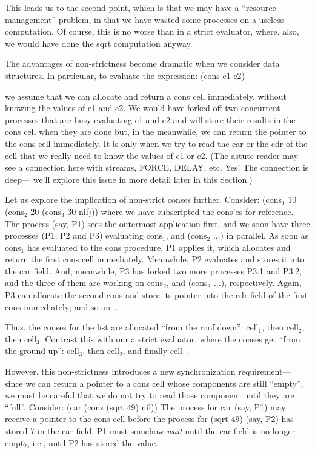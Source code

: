 This leads us to the second point, which is that we may have a
``resource-management'' problem, in that we have wasted some
processes on a useless computation.  Of course, this is no worse
than in a strict evaluator, where, also, we would have done the {\cf
sqrt} computation anyway.

The advantages of non-strictness become dramatic when we consider data
structures.  In particular, to evaluate the expression:
\beginlisp
(cons e1 e2)
\endlisp

 we assume that we can allocate and return a cons cell immediately,
without knowing the values of {\cf e1} and {\cf e2}.  We would have
forked off two concurrent processes that are busy evaluating {\cf e1}
and {\cf e2} and will store their results in the cons cell when they
are done but, in the meanwhile, we can return the pointer to the cons
cell immediately.  It is only when we try to read the {\cf car} or the
{\cf cdr} of the cell that we really need to know the values of {\cf
e1} or {\cf e2}.  (The astute reader may see a connection here with
streams, {\cf FORCE}, {\cf DELAY}, etc.  Yes!  The connection is
deep--- we'll explore this issue in more detail later in this
Section.)

Let us explore the implication of non-strict conses further.  Consider:
\beginlisp
(cons$_1$ 10 (cons$_2$ 20 (cons$_3$ 30 nil)))
\endlisp
 where we have subscripted the {\cf cons}'es for reference.  The
process (say, P1) sees the outermost application first, and we soon have
three processes (P1, P2 and P3) evaluating {\cf cons$_1$}, {} and {\cf
(cons$_2$ ...)} in parallel. As soon as {\cf cons$_1$} has evaluated to the
cons procedure, P1 applies it, which allocates and return the first cons cell
immediately.  Meanwhile, P2 evaluates {} and stores it into the car
field.  And, meanwhile, P3 has forked two more processes P3.1 and P3.2, and
the three of them are working on {\cf cons$_2$}, {} and {\cf (cons$_3$
...)}, respectively.  Again, P3 can allocate the second cons and store its
pointer into the cdr field of the first cons immediately; and so on ...

Thus, the conses for the list are allocated ``from the roof down'':
cell$_1$, then cell$_2$, then cell$_3$.  Contrast this with our a
strict evaluator, where the conses get ``from the ground up'':
cell$_3$, then cell$_2$, and finally cell$_1$.

However, this non-strictness introduces a new synchronization
requirement--- since we can return a pointer to a cons cell whose
components are still ``empty'', we must be careful that we do not try
to read those component until they are ``full''.  Consider:
\beginlisp
(car (cons (sqrt 49) nil))
\endlisp
 The process for {\cf car} (say, P1) may receive a pointer to the cons
cell before the process for {\cf (sqrt 49)} (say, P2) has stored 7 in
the car field.  P1 must somehow {\em wait\/} until the car field is no
longer empty, i.e., until P2 has stored the value.

